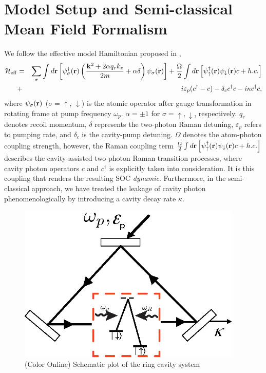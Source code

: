 \documentclass[atoms,article,submit,moreauthors,pdftex,12pt,a4paper]{mdpi}
\def\ba{\begin{eqnarray}}
\def\ea{\end{eqnarray}}
\begin{document}
\section{Model Setup and Semi-classical Mean Field Formalism} \label{meanfield}

We follow the effective model Hamiltonian proposed in \cite{cavitySOC}, 
\ba
 \mathcal{H}_{\rm eff}& = & \sum_\sigma\int d{\bf r}\left[ \psi^\dagger_\sigma({\bf r})\left(\frac{ {\bf k}^2+ 2\alpha q_r {k}_z}{2m}+\alpha\delta\right)\psi_\sigma({\bf r})\right]+  \frac{\Omega}{2}\int d{\bf r}\left[{\psi}_{\uparrow}^{\dagger}({\bf r}){\psi}_{\downarrow}({\bf r})c+ h.c. \right]\nonumber \\
 & + & i\varepsilon_{p}(c^{\dagger}-c)-\delta_c c^{\dagger}c-i\kappa c^{\dagger}c, \label{effH}
 \ea
where $\psi_\sigma({\bf r})$ ($\sigma = \uparrow$, $\downarrow$) is the atomic operator after gauge transformation in rotating frame at pump frequency $\omega_p$. $\alpha=\pm 1$ for $\sigma=\uparrow,\downarrow$, respectively. $q_r$ denotes recoil momentum, $\delta$ represents the two-photon Raman detuning, $\varepsilon_p$ refers to pumping rate, and $\delta_c$ is the cavity-pump detuning. $\Omega$ denotes the atom-photon coupling strength, however, the Raman coupling term $ \frac{\Omega}{2}\int d{\bf r}\left[\psi_{\uparrow}^{\dagger}({\bf r})\psi_{\downarrow}({\bf r})c+h.c.\right]$ describes the cavity-assisted two-photon Raman transition processes, where cavity photon operators $c$ and $c^\dag$ is explicitly taken into consideration. It is this coupling that renders the resulting SOC \emph{dynamic}. Furthermore, in the semi-classical approach, we have treated the leakage of cavity photon phenomenologically by introducing a cavity decay rate $\kappa$. 

\begin{figure}[htp]
\includegraphics[width=0.95\textwidth]{schematic}\caption{(Color Online) Schematic plot of the ring cavity system}\label{schematic}
\end{figure}
\end{document}
